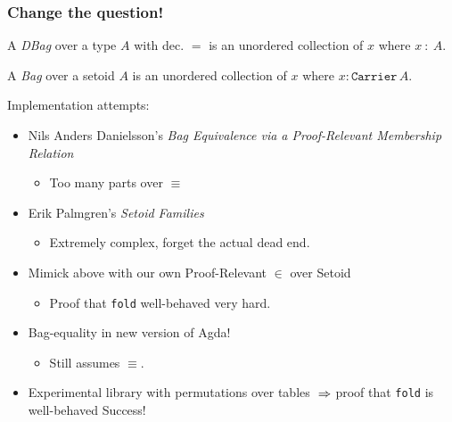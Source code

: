 \documentclass[serif,mathserif,professionalfont,10pt]{beamer}
\begin{document}
\begin{frame}
\frametitle{Change the question!}
\begin{definition}
A \emph{DBag} over a type $A$ with dec. $=$ is an unordered
collection of $x$ where $x~:~A$.
\end{definition}
\pause
\begin{definition}
A \emph{Bag} over a setoid $A$ is an unordered
collection of $x$ where $x : \texttt{Carrier}\, A$.
\end{definition}
\pause
Implementation attempts:
\begin{itemize}
\item<4->Nils Anders Danielsson's
\textit{Bag Equivalence via a Proof-Relevant Membership Relation}
\begin{itemize}
\item<5->Too many parts over $\equiv$
\end{itemize}
\item<6->Erik Palmgren's \textit{Setoid Families}
\begin{itemize}
\item<7->Extremely complex, forget the actual dead end.
\end{itemize}
\item<8->Mimick above with our own Proof-Relevant $\in$ over
  Setoid
\begin{itemize}
\item<9->Proof that \texttt{fold} well-behaved very hard.
\end{itemize}
\item<10->Bag-equality in new version of Agda!
\begin{itemize}
\item<11->Still assumes $\equiv$.
\end{itemize}
\item<12->Experimental library with permutations over tables
$\newline\Rightarrow$ proof that \texttt{fold} is well-behaved
\hfill \pause\alert{Success!}
\end{itemize}
\end{frame}
\end{document}
